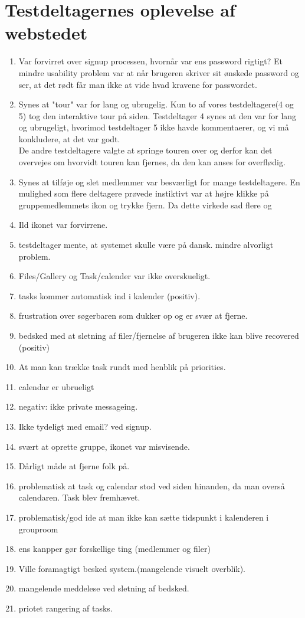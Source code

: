 \documentclass[12pt]{article}
\begin{document}
\section{Testdeltagernes oplevelse af webstedet}
\begin{enumerate}
  \item Var forvirret over signup processen, hvornår var ens password rigtigt?
        Et mindre usability problem var at når brugeren skriver sit ønskede password og ser, at det rødt får man ikke at vide hvad kravene for passwordet. 
  \item Synes at "tour" var for lang og ubrugelig.
        Kun to af vores testdeltagere(4 og 5) tog den interaktive tour på siden. Testdeltager 4 synes at den var for lang og ubrugeligt, hvorimod testdeltager 5 ikke havde   kommentaerer, og vi må konkludere, at det var godt. \\
        De andre testdeltagere valgte at springe touren over og derfor kan det overvejes om hvorvidt touren kan fjernes, da den kan anses for overflødig.        
  \item Synes at tilføje og slet medlemmer var besværligt for mange testdeltagere.
        En mulighed som flere deltagere prøvede instiktivt var at højre klikke på gruppemedlemmets ikon og trykke fjern. Da dette virkede sad flere og 
  \item Ild ikonet var forvirrene.
  \item testdeltager mente, at systemet skulle være på dansk. mindre alvorligt problem.
  \item Files/Gallery og Task/calender var ikke overskueligt.
  \item tasks kommer automatisk ind i kalender (positiv). 
  \item frustration over søgerbaren som dukker op og er svær at fjerne.
  \item bedsked med at sletning af filer/fjernelse af brugeren ikke kan blive recovered (positiv)
  \item At man kan trække task rundt med henblik på priorities.
  \item calendar er ubrueligt
  \item negativ: ikke private messageing. 
  \item Ikke tydeligt med email? ved signup. 
  \item svært at oprette gruppe, ikonet var misvisende.
  \item Dårligt måde at fjerne folk på.
  \item problematisk at task og calendar stod ved siden hinanden, da man overså calendaren. Task blev fremhævet.
  \item problematisk/god ide at man ikke kan sætte tidspunkt i kalenderen i grouproom
  \item ens kanpper gør forskellige ting (medlemmer og filer)
  \item Ville foramagtigt besked system.(mangelende visuelt overblik).
  \item mangelende meddelese ved sletning af bedsked. 
  \item priotet rangering af tasks.
\end{enumerate}
\end{document}

